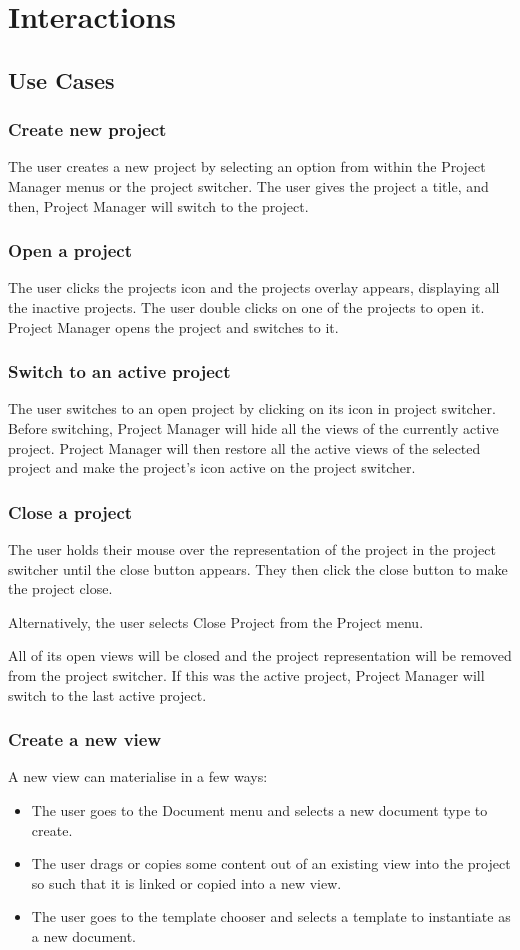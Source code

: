 \documentclass[11pt]{report}
\newcommand{\proman}{Project Manager\xspace}
\begin{document}
\chapter{Interactions}
\section{Use Cases}

\subsection{Create new project}
The user creates a new project by selecting an option from within the \proman menus or the project switcher. The user gives the project a title, and then, \proman will switch to the project.

\subsection{Open a project}
The user clicks the projects icon and the projects overlay appears, displaying all the inactive projects. The user double clicks on one of the projects to open it. \proman opens the project and switches to it.

\subsection{Switch to an active project}
The user switches to an open project by clicking on its icon in project switcher. Before switching, \proman will hide all the views of the currently active project. \proman will then restore all the active views of the selected project and make the project's icon active on the project switcher.

\subsection{Close a project}
The user holds their mouse over the representation of the project in the project switcher until the close button appears. They then click the close button to make the project close.

Alternatively, the user selects Close Project from the Project menu.

All of its open views will be closed and the project representation will be removed from the project switcher. If this was the active project, \proman will switch to the last active project.

\subsection{Create a new view}
A new view can materialise in a few ways:
\begin{itemize}
\item The user goes to the Document menu and selects a new document type to create.
\item The user drags or copies some content out of an existing view into the project so such that it is linked or copied into a new view.
\item The user goes to the template chooser and selects a template to instantiate as a new document.
\end{itemize}
\end{document}
